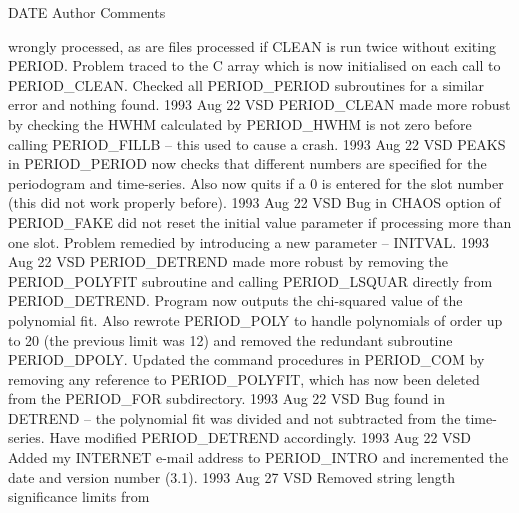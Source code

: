 \documentclass[twoside,11pt,noabs,nolof]{starlink}
\begin{document}
\newpage

\begin{small}
\begin{terminalv}
   DATE       Author            Comments

                         wrongly processed, as are files processed if CLEAN
                         is run twice without exiting PERIOD. Problem traced
                         to the C array which is now initialised on each
                         call to PERIOD_CLEAN. Checked all PERIOD_PERIOD
                         subroutines for a similar error and nothing
                         found.
1993 Aug 22    VSD       PERIOD_CLEAN made more robust by checking the
                         HWHM calculated by PERIOD_HWHM is not zero before
                         calling PERIOD_FILLB -- this used to cause a crash.
1993 Aug 22    VSD       PEAKS in PERIOD_PERIOD now checks that different
                         numbers are specified for the periodogram and
                         time-series. Also now quits if a 0 is entered for
                         the slot number (this did not work properly before).
1993 Aug 22    VSD       Bug in CHAOS option of PERIOD_FAKE did not reset
                         the initial value parameter if processing more
                         than one slot. Problem remedied by introducing
                         a new parameter -- INITVAL.
1993 Aug 22    VSD       PERIOD_DETREND made more robust by removing the
                         PERIOD_POLYFIT subroutine and calling PERIOD_LSQUAR
                         directly from PERIOD_DETREND. Program now outputs
                         the chi-squared value of the polynomial fit. Also
                         rewrote PERIOD_POLY to handle polynomials of order
                         up to 20 (the previous limit was 12) and removed
                         the redundant subroutine PERIOD_DPOLY. Updated the
                         command procedures in PERIOD_COM by removing any
                         reference to PERIOD_POLYFIT, which has now been
                         deleted from the PERIOD_FOR subdirectory.
1993 Aug 22    VSD       Bug found in DETREND -- the polynomial fit was
                         divided and not subtracted from the time-series.
                         Have modified PERIOD_DETREND accordingly.
1993 Aug 22    VSD       Added my INTERNET e-mail address to PERIOD_INTRO
                         and incremented the date and version number (3.1).
1993 Aug 27    VSD       Removed string length significance limits from

\end{terminalv}
\end{small}
\end{document}
